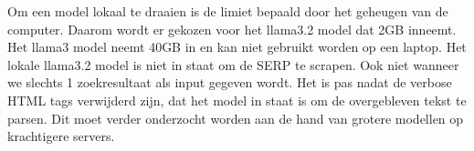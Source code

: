 Om een model lokaal te draaien is de limiet bepaald door het geheugen van de computer. Daarom wordt er gekozen voor het llama3.2 model dat 2GB inneemt. Het llama3 model neemt 40GB in en kan niet gebruikt worden op een laptop.
Het lokale llama3.2 model is niet in staat om de SERP te scrapen. Ook niet wanneer we slechts 1 zoekresultaat als input gegeven wordt. Het is pas nadat de verbose HTML tags verwijderd zijn, dat het model in staat is om de overgebleven tekst te parsen.
Dit moet verder onderzocht worden aan de hand van grotere modellen op  krachtigere servers.
